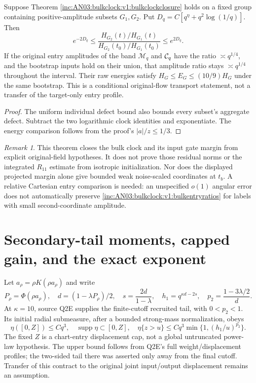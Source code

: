 \documentclass[11pt]{article}
\theoremstyle{remark}\newtheorem{remark}[theorem]{Remark}
\begin{document}
\begin{corollary}
\label{inc:AN03:bulkclock:v1:bulkweights}
Suppose Theorem \ref{inc:AN03:bulkclock:v1:bulkclockclosure} holds on a fixed group containing positive-amplitude subsets $G_1,G_2$. Put $D_q=C[q^\eta+q^2\log(1/q)]$. Then
\[
 e^{-2D_q}\le
 \frac{H_{G_2}(t)/H_{G_1}(t)}{H_{G_2}(t_0)/H_{G_1}(t_0)}
 \le e^{2D_q}.
\]
If the original entry amplitudes of the band $\mathcal M_q$ and $\mathcal C_q$ have the ratio $\asymp q^{1/4}$, and the bootstrap inputs hold on their union, that amplitude ratio stays $\asymp q^{1/4}$ throughout the interval. Their raw energies satisfy $H_G\le E_G\le(10/9)H_G$ under the same bootstrap. This is a conditional original-flow transport statement, not a transfer of the target-only entry profile.
\end{corollary}
\begin{proof}
The uniform individual defect bound also bounds every subset's aggregate defect. Subtract the two logarithmic clock identities and exponentiate. The energy comparison follows from the proof's $|a|/z\le1/3$.
\end{proof}

\begin{remark}
This theorem closes the bulk clock and its input gate margin from explicit original-field hypotheses. It does not prove those residual norms or the integrated $R_{11}$ estimate from isotropic initialization. Nor does the displayed projected margin alone give bounded weak noise-scaled coordinates at $t_b$. A relative Cartesian entry comparison is needed: an unspecified $o(1)$ angular error does not automatically preserve \eqref{inc:AN03:bulkclock:v1:bulkentryratios} for labels with small second-coordinate amplitude.
\end{remark}

\section{Secondary-tail moments, capped gain, and the exact exponent}
Let $a_\rho=\rho K(\rho a_\rho)$ and write
\[
 P_\rho=\Phi(\rho a_\rho),\quad d=(1-\lambda P_\rho)/2,\quad
 s=\frac{2d}{1-\lambda},\quad
 h_1=q^{\kappa d-2s},\quad p_2=\frac{1-3\lambda/2}{d}.
\]
At $\kappa=10$, source Q2E supplies the finite-cutoff recruited tail, with $0<p_2<1$. Its initial radial submeasure, after a bounded strong-mass normalization, obeys
\begin{equation}\label{inc:AN03:bulkclock:v1:tailcontract}
 \eta([0,Z])\le Cq^3,\quad \operatorname{supp}\eta\subset[0,Z],\quad
 \eta\{z>u\}\le Cq^3\min\{1,(h_1/u)^{p_2}\}.
\end{equation}
The fixed $Z$ is a chart-entry displacement cap, not a global untruncated power-law hypothesis. The upper bound follows from Q2E's full weight/displacement profiles; the two-sided tail there was asserted only away from the final cutoff. Transfer of this contract to the original joint input/output displacement remains an assumption.
\end{document}
